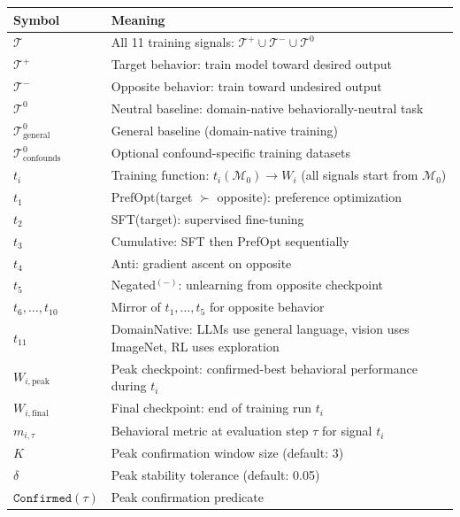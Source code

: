 \documentclass[11pt]{article}
\begin{document}
\begin{center}
\begin{tabular}{lp{}}
\toprule
\textbf{Symbol} & \textbf{Meaning} \\
\midrule
$\mathcal{T}$ & All 11 training signals: $\mathcal{T}^+ \cup \mathcal{T}^- \cup \mathcal{T}^0$ \\
$\mathcal{T}^+$ & Target behavior: train model toward desired output \\
$\mathcal{T}^-$ & Opposite behavior: train toward undesired output \\
$\mathcal{T}^0$ & Neutral baseline: domain-native behaviorally-neutral task \\
$\mathcal{T}^0_{\text{general}}$ & General baseline (domain-native training) \\
$\mathcal{T}^0_{\text{confounds}}$ & Optional confound-specific training datasets \\
$t_i$ & Training function: $t_i(\mathcal{M}_0) \to W_i$ (all signals start from $\mathcal{M}_0$) \\
$t_1$ & PrefOpt(target $\succ$ opposite): preference optimization \\
$t_2$ & SFT(target): supervised fine-tuning \\
$t_3$ & Cumulative: SFT then PrefOpt sequentially \\
$t_4$ & Anti: gradient ascent on opposite \\
$t_5$ & Negated$^{(-)}$: unlearning from opposite checkpoint \\
$t_6, \ldots, t_{10}$ & Mirror of $t_1, \ldots, t_5$ for opposite behavior \\
$t_{11}$ & DomainNative: LLMs use general language, vision uses ImageNet, RL uses exploration \\
$W_{i,\text{peak}}$ & Peak checkpoint: confirmed-best behavioral performance during $t_i$ \\
$W_{i,\text{final}}$ & Final checkpoint: end of training run $t_i$ \\
$m_{i,\tau}$ & Behavioral metric at evaluation step $\tau$ for signal $t_i$ \\
$K$ & Peak confirmation window size (default: 3) \\
$\delta$ & Peak stability tolerance (default: 0.05) \\
$\texttt{Confirmed}(\tau)$ & Peak confirmation predicate \\
\bottomrule
\end{tabular}
\end{center}
\end{document}
